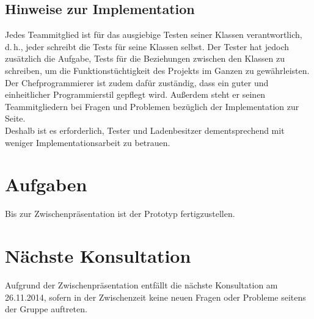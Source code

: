 \documentclass{scrartcl}
\begin{document}
\subsection{Hinweise zur Implementation}
Jedes Teammitglied ist für das ausgiebige Testen seiner Klassen verantwortlich, d.\,h., jeder schreibt die Tests für seine Klassen selbst. Der Tester hat jedoch zusätzlich die Aufgabe, Tests für die Beziehungen zwischen den Klassen zu schreiben, um die Funktionstüchtigkeit des Projekts im Ganzen zu gewährleisten. \\
Der Chefprogrammierer ist zudem dafür zuständig, dass ein guter und einheitlicher Programmierstil gepflegt wird. Außerdem steht er seinen Teammitgliedern bei Fragen und Problemen bezüglich der Implementation zur Seite. \\
Deshalb ist es erforderlich, Tester und Ladenbesitzer dementsprechend mit weniger Implementationsarbeit zu betrauen.

\vspace*{1em}

\section{Aufgaben}
Bis zur Zwischenpr\"asentation ist der Prototyp fertigzustellen.

\vspace*{1em}

\section{N\"achste Konsultation}
Aufgrund der Zwischenpräsentation entfällt die nächste Konsultation am 26.11.2014, sofern in der Zwischenzeit keine neuen Fragen oder Probleme seitens der Gruppe auftreten.
\end{document}
